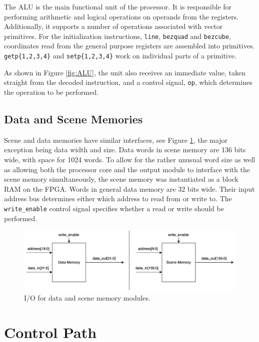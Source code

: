 The ALU is the main functional unit of the processor.
It is responsible for performing arithmetic and logical operations on operands from the registers.
Additionally, it supports a number of operations associated with vector primitives.
For the initialization instructions, \texttt{line}, \texttt{bezquad} and \texttt{bezcube}, coordinates read from the general purpose registers are assembled into primitives.
\texttt{getp\{1,2,3,4\}} and \texttt{setp\{1,2,3,4\}} work on individual parts of a primitive.

As shown in Figure \ref{fig:ALU}, the unit also receives an immediate value, taken straight from the decoded instruction, and a control signal, \texttt{op}, which determines the operation to be performed.

\subsection{Data and Scene Memories}

Scene and data memories have similar interfaces, see Figure \ref{fig:data-scene-memories}, the major exception being data width and size.
Data words in scene memory are 136 bits wide, with space for 1024 words.
To allow for the rather unusual word size as well as allowing both the processor core and the output module to interface with the scene memory simultaneously, the scene memory was instantiated as a block RAM on the FPGA.
Words in general data memory are 32 bits wide.
Their input address bus determines either which address to read from or write to.
The \texttt{write\_enable} control signal specifies whether a read or write should be performed.

\begin{figure}[h!]
    \centering
    \includegraphics[width=0.9\linewidth]{images/data-scene-memories.png}
    \caption{I/O for data and scene memory modules.}
    \label{fig:data-scene-memories}
\end{figure}


\section{Control Path}

